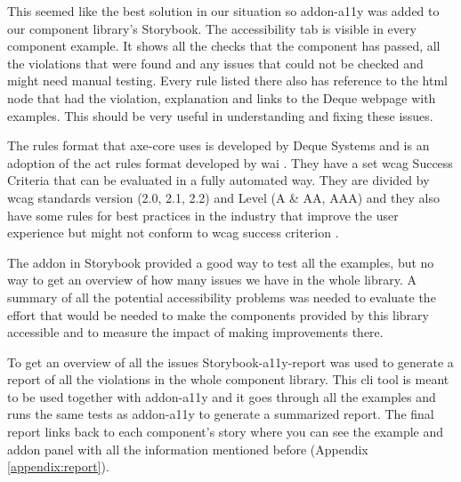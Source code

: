 \documentclass{master_thesis}
\begin{document}
This seemed like the best solution in our situation so addon-a11y was added to our component library’s Storybook. The accessibility tab is visible in every component example. It shows all the checks that the component has passed, all the violations that were found and any issues that could not be checked and might need manual testing. Every rule listed there also has reference to the \ac{html} node that had the violation, explanation and links to the Deque webpage with examples. This should be very useful in understanding and fixing these issues.

The rules format that axe-core uses is developed by Deque Systems and is an adoption of the \ac{act} rules format developed by \ac{wai} \citep{Fiers2017}. They have a set \ac{wcag} Success Criteria that can be evaluated in a fully automated way. They are divided by \ac{wcag} standards version (2.0, 2.1, 2.2) and Level (A \& AA, AAA) and they also have some rules for best practices in the industry that improve the user experience but might not conform to \ac{wcag} success criterion \citep{Fiers2023}.

The addon in Storybook provided a good way to test all the examples, but no way to get an overview of how many issues we have in the whole library. A summary of all the potential accessibility problems was needed to evaluate the effort that would be needed to make the components provided by this library accessible and to measure the impact of making improvements there.

To get an overview of all the issues Storybook-a11y-report \citep{Karube2020} was used to generate a report of all the violations in the whole component library. This \ac{cli} tool is meant to be used together with addon-a11y and it goes through all the examples and runs the same tests as addon-a11y to generate a summarized report. The final report links back to each component's story where you can see the example and addon panel with all the information mentioned before (Appendix \ref{appendix:report}).
\end{document}
